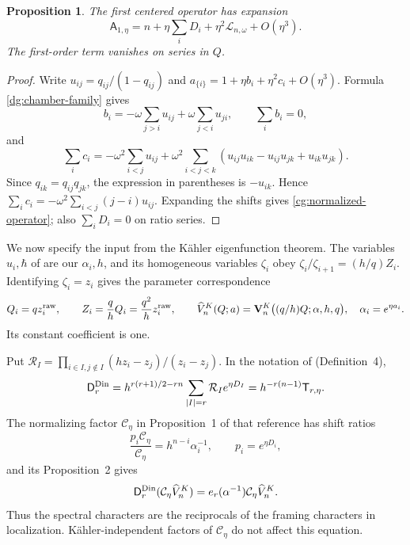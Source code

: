 \documentclass[11pt]{amsart}
\newtheorem{proposition}[theorem]{Proposition}
\theoremstyle{definition}
\theoremstyle{remark}
\numberwithin{equation}{section}
\begin{document}
\begin{proposition}\label{dg:trigonometric-limit}
The first centered operator has expansion
\begin{equation}\label{dg:quadratic-expansion}
 \mathsf A_{1,\eta}
 =n+\eta\sum_iD_i+\eta^2\mathcal L_{n,\omega}+O(\eta^3).
\end{equation}
The first-order term vanishes on series in $Q$.
\end{proposition}

\begin{proof}
Write $u_{ij}=q_{ij}/(1-q_{ij})$ and
$a_{\{i\}}=1+\eta b_i+\eta^2c_i+O(\eta^3)$. Formula
\eqref{dg:chamber-family} gives
\[
 b_i=-\omega\sum_{j>i}u_{ij}
       +\omega\sum_{j<i}u_{ji},\qquad \sum_i b_i=0,
\]
and
\[
 \sum_i c_i=-\omega^2\sum_{i<j}u_{ij}
 +\omega^2\sum_{i<j<k}
 (u_{ij}u_{ik}-u_{ij}u_{jk}+u_{ik}u_{jk}).
\]
Since $q_{ik}=q_{ij}q_{jk}$, the expression in parentheses is
$-u_{ik}$. Hence
$\sum_i c_i=-\omega^2\sum_{i<j}(j-i)u_{ij}$.
Expanding the shifts gives \eqref{cg:normalized-operator}; also
$\sum_iD_i=0$ on ratio series.
\end{proof}

We now specify the input from the K\"ahler eigenfunction theorem.
The variables $u_i,\hbar$ of \cite{Din21} are our
$\alpha_i,h$, and its homogeneous variables $\zeta_i$ obey
$\zeta_i/\zeta_{i+1}=(h/q)Z_i$. Identifying $\zeta_i=z_i$
gives the parameter correspondence
\begin{equation}\label{dg:vertex-kahler-dictionary}
 Q_i=qz_i^{\rm raw},\qquad
 Z_i=\frac qh Q_i=\frac{q^2}{h}z_i^{\rm raw},\qquad
 \widehat V_n^K(Q;a)=
 \mathbf V_n^K\bigl((q/h)Q;\alpha,h,q\bigr),
 \quad \alpha_i=e^{\eta a_i}.
\end{equation}
Its constant coefficient is one.

Put
$\mathcal R_I=\prod_{i\in I,j\notin I}(hz_i-z_j)/(z_i-z_j)$.
In the notation of \cite{Din21} (Definition~4),
\[
 \mathsf D_r^{\rm Din}
 =h^{r(r+1)/2-rn}\sum_{|I|=r}\mathcal R_Ie^{\eta D_I}
 =h^{-r(n-1)}\mathsf T_{r,\eta}.
\]
The normalizing factor $\mathcal C_\eta$ in Proposition~1 of
that reference has shift ratios
\[
 \frac{p_i\mathcal C_\eta}{\mathcal C_\eta}
 =h^{n-i}\alpha_i^{-1},\qquad p_i=e^{\eta D_i},
\]
and its Proposition~2 gives
\[
 \mathsf D_r^{\rm Din}
 (\mathcal C_\eta\widehat V_n^K)
 =e_r(\alpha^{-1})\mathcal C_\eta\widehat V_n^K.
\]
Thus the spectral characters are the reciprocals of the framing
characters in localization. K\"ahler-independent factors of
$\mathcal C_\eta$ do not affect this equation.
\end{document}
